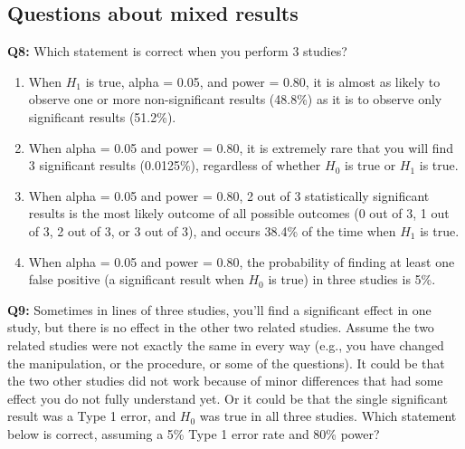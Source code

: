 \documentclass[
  oneside]{krantz}
\providecommand{\tightlist}{%
  \setlength{\itemsep}{0pt}\setlength{\parskip}{0pt}}
\begin{document}
\hypertarget{questions-about-mixed-results}{%
\subsection{Questions about mixed results}\label{questions-about-mixed-results}}

\textbf{Q8:} Which statement is correct when you perform 3 studies?

\begin{enumerate}
\def\labelenumi{\Alph{enumi})}
\tightlist
\item
  When \(H_1\) is true, alpha = 0.05, and power = 0.80, it is almost as likely to observe one or more non-significant results (48.8\%) as it is to observe only significant results (51.2\%).
\item
  When alpha = 0.05 and power = 0.80, it is extremely rare that you will find 3 significant results (0.0125\%), regardless of whether \(H_0\) is true or \(H_1\) is true.
\item
  When alpha = 0.05 and power = 0.80, 2 out of 3 statistically significant results is the most likely outcome of all possible outcomes (0 out of 3, 1 out of 3, 2 out of 3, or 3 out of 3), and occurs 38.4\% of the time when \(H_1\) is true.
\item
  When alpha = 0.05 and power = 0.80, the probability of finding at least one false positive (a significant result when \(H_0\) is true) in three studies is 5\%.
\end{enumerate}

\textbf{Q9:} Sometimes in lines of three studies, you'll find a significant effect in one study, but there is no effect in the other two related studies. Assume the two related studies were not exactly the same in every way (e.g., you have changed the manipulation, or the procedure, or some of the questions). It could be that the two other studies did not work because of minor differences that had some effect you do not fully understand yet. Or it could be that the single significant result was a Type 1 error, and \(H_0\) was true in all three studies. Which statement below is correct, assuming a 5\% Type 1 error rate and 80\% power?
\end{document}
